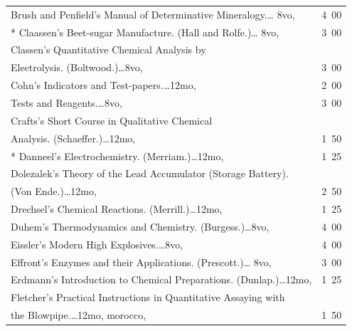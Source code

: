 \documentclass[a4paper,12pt]{book}[2004/02/16]
\theoremstyle{ilemma}
\theoremstyle{itheorem}
\theoremstyle{iother}
\theoremstyle{icorollary}
\theoremstyle{numcorollary}
\theoremstyle{idefinition}
\begin{document}
\begin{longtable}{@{}l@{ }r@{}}
Brush and Penfield's Manual of Determinative Mineralogy.\dotfill\ldots
8vo, &4\ 00\\

* Claassen's Beet-sugar Manufacture. (Hall and Rolfe.)\dotfill\ldots
  8vo, &3\ 00\\

Classen's Quantitative Chemical Analysis by\\

\nopagebreak
\indent\indent Electrolysis. (Boltwood.)\dotfill\ldots 8vo, &3\ 00\\

Cohn's Indicators and Test-papers.\dotfill\ldots 12mo, &2\ 00\\

\nopagebreak
\indent Tests and Reagents.\dotfill\ldots 8vo, &3\ 00\\

Crafts's Short Course in Qualitative Chemical\\

\nopagebreak
\indent\indent Analysis. (Schaeffer.)\dotfill\ldots 12mo, &1\ 50\\

* Danneel's Electrochemistry. (Merriam.)\dotfill\ldots 12mo, & 1\ 25\\

Dolezalek's Theory of the Lead Accumulator (Storage Battery).\\

\nopagebreak
\indent (Von Ende.)\dotfill\ldots 12mo, &2\ 50\\

Drechsel's Chemical Reactions. (Merrill.)\dotfill\ldots 12mo, &1\ 25\\

Duhem's Thermodynamics and Chemistry. (Burgess.)\dotfill\ldots 8vo, &4\ 00\\

Eissler's Modern High Explosives.\dotfill\ldots 8vo, &4\ 00\\

Effront's Enzymes and their Applications. (Prescott.)\dotfill\ldots
8vo, &3\ 00\\

Erdmann's Introduction to Chemical
Preparations. (Dunlap.)\dotfill\ldots 12mo, &1\ 25\\

Fletcher's Practical Instructions in Quantitative Assaying with\\

\nopagebreak
\indent\indent the Blowpipe.\dotfill\ldots 12mo, morocco, &1\ 50\\


\end{longtable}
\end{document}
